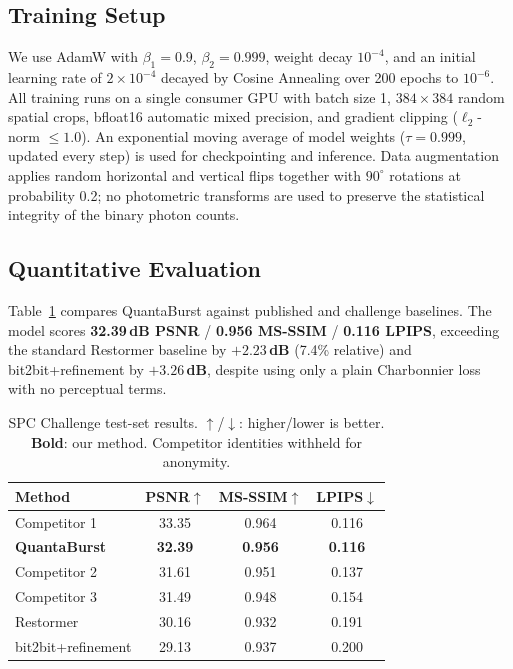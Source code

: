 \documentclass[10pt,twocolumn,letterpaper]{article}
\begin{document}
\subsection{Training Setup}

We use AdamW with $\beta_1{=}0.9$, $\beta_2{=}0.999$, weight
decay $10^{-4}$, and an initial learning rate of $2{\times}10^{-4}$
decayed by Cosine Annealing over 200 epochs to $10^{-6}$.
All training runs on a single consumer GPU with batch size 1,
$384{\times}384$ random spatial crops, bfloat16 automatic mixed
precision, and gradient clipping ($\ell_2$-norm $\le 1.0$).
An exponential moving average of model weights
($\tau{=}0.999$, updated every step) is used for checkpointing
and inference.
Data augmentation applies random horizontal and vertical flips
together with $90^\circ$ rotations at probability 0.2; no
photometric transforms are used to preserve the statistical
integrity of the binary photon counts.

\subsection{Quantitative Evaluation}

Table~\ref{tab:main} compares QuantaBurst against published and
challenge baselines.  The model scores
\textbf{32.39\,dB PSNR} / \textbf{0.956 MS-SSIM} /
\textbf{0.116 LPIPS}, exceeding the standard Restormer baseline
by $\mathbf{+2.23}$\,\textbf{dB} (7.4\% relative) and
bit2bit+refinement by $\mathbf{+3.26}$\,\textbf{dB}, despite
using only a plain Charbonnier loss with no perceptual terms.

\begin{table}[t]
  \centering
  \small
  \caption{SPC Challenge test-set results.
    $\uparrow$/$\downarrow$: higher/lower is better.
    \textbf{Bold}: our method.
    Competitor identities withheld for anonymity.}
  \label{tab:main}
  \setlength{\tabcolsep}{3pt}
  \begin{tabular}{lccc}
    \toprule
    \textbf{Method}
      & \textbf{PSNR}$\uparrow$
      & \textbf{MS-SSIM}$\uparrow$
      & \textbf{LPIPS}$\downarrow$ \\
    \midrule
    Competitor 1         & 33.35 & 0.964 & 0.116 \\
    \textbf{QuantaBurst} & \textbf{32.39} & \textbf{0.956} & \textbf{0.116} \\
    Competitor 2         & 31.61 & 0.951 & 0.137 \\
    Competitor 3         & 31.49 & 0.948 & 0.154 \\
    Restormer~\cite{zamir2022restormer}
                         & 30.16 & 0.932 & 0.191 \\
    bit2bit+refinement   & 29.13 & 0.937 & 0.200 \\
    \bottomrule
  \end{tabular}
\end{table}
\end{document}
